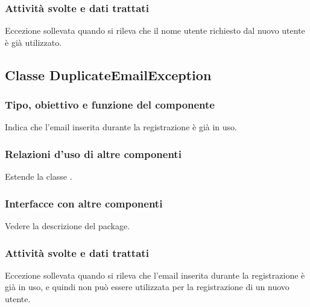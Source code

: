 \subsubsection*{Attivit\`a svolte e dati trattati}
Eccezione sollevata quando si rileva che il nome utente richiesto dal nuovo
utente \`e gi\`a utilizzato.

\subsection{Classe DuplicateEmailException}
\subsubsection*{Tipo, obiettivo e funzione del componente}
Indica che l'email inserita durante la registrazione \`e gi\`a in uso.
\subsubsection*{Relazioni d'uso di altre componenti}
Estende la classe .
\subsubsection*{Interfacce con altre componenti}
Vedere la descrizione del package.
\subsubsection*{Attivit\`a svolte e dati trattati}
Eccezione sollevata quando si rileva che l'email inserita durante la
registrazione \`e gi\`a in uso, e quindi non pu\`o essere utilizzata per la
registrazione di un nuovo utente.

